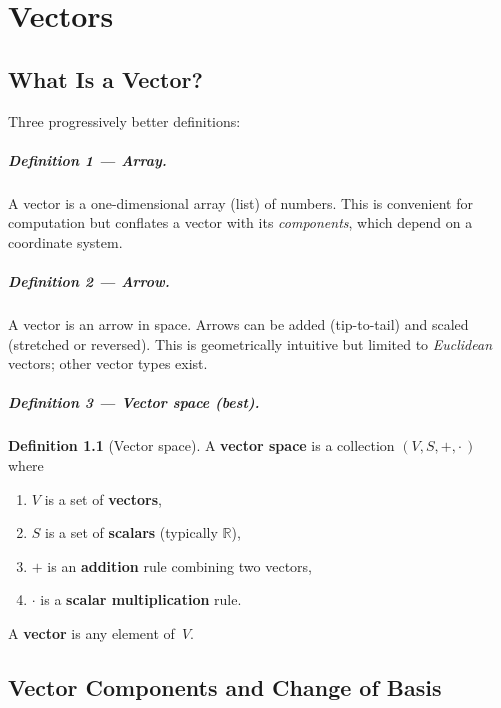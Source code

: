 \documentclass[12pt, a4paper]{report}
\theoremstyle{definition}
\newtheorem{definition}{Definition}[chapter]
\theoremstyle{plain}
\theoremstyle{remark}
\newcommand{\R}{\mathbb{R}}
\begin{document}
\chapter{Vectors}\label{ch:vectors}

\section{What Is a Vector?}

Three progressively better definitions:

\paragraph{Definition 1 --- Array.}
A vector is a one-dimensional array (list) of numbers.
This is convenient for computation but conflates a vector with its
\emph{components}, which depend on a coordinate system.

\paragraph{Definition 2 --- Arrow.}
A vector is an arrow in space.  Arrows can be added (tip-to-tail) and scaled
(stretched or reversed).  This is geometrically intuitive but limited to
\emph{Euclidean} vectors; other vector types exist.

\paragraph{Definition 3 --- Vector space (best).}
\begin{definition}[Vector space]
A \textbf{vector space} is a collection $(V, S, +, \cdot\,)$ where
\begin{enumerate}[nosep]
    \item $V$ is a set of \textbf{vectors},
    \item $S$ is a set of \textbf{scalars} (typically $\R$),
    \item $+$ is an \textbf{addition} rule combining two vectors,
    \item $\cdot$ is a \textbf{scalar multiplication} rule.
\end{enumerate}
A \textbf{vector} is any element of~$V$.
\end{definition}

\section{Vector Components and Change of Basis}
\end{document}
